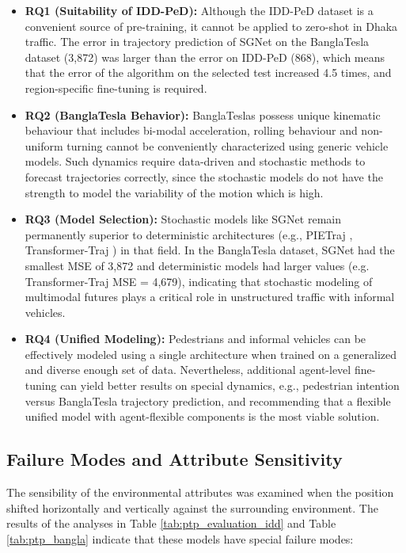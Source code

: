 \documentclass[12pt, a4paper]{article}
\begin{document}
\begin{itemize}
    \item \textbf{RQ1 (Suitability of IDD-PeD):} Although the IDD-PeD dataset \cite{bokkasam2025pedestrian} is a convenient source of pre-training, it cannot be applied to zero-shot in Dhaka traffic. The error in trajectory prediction of SGNet \cite{wang2022stepwise} on the BanglaTesla dataset (3,872) was larger than the error on IDD-PeD (868), which means that the error of the algorithm on the selected test increased 4.5 times, and region-specific fine-tuning is required.
    
    \item \textbf{RQ2 (BanglaTesla Behavior):} BanglaTeslas possess unique kinematic behaviour that includes bi-modal acceleration, rolling behaviour and non-uniform turning cannot be conveniently characterized using generic vehicle models. Such dynamics require data-driven and stochastic methods to forecast trajectories correctly, since the stochastic models do not have the strength to model the variability of the motion which is high.
    
    \item \textbf{RQ3 (Model Selection):} Stochastic models like SGNet \cite{wang2022stepwise} remain permanently superior to deterministic architectures (e.g., PIETraj \cite{rasouli2019pie}, Transformer-Traj \cite{giuliari2021transformer}) in that field. In the BanglaTesla dataset, SGNet had the smallest MSE of 3,872 and deterministic models had larger values (e.g. Transformer-Traj MSE = 4,679), indicating that stochastic modeling of multimodal futures plays a critical role in unstructured traffic with informal vehicles.
    
    \item \textbf{RQ4 (Unified Modeling):} Pedestrians and informal vehicles can be effectively modeled using a single architecture when trained on a generalized and diverse enough set of data. Nevertheless, additional agent-level fine-tuning can yield better results on special dynamics, e.g., pedestrian intention versus BanglaTesla trajectory prediction, and recommending that a flexible unified model with agent-flexible components is the most viable solution.
\end{itemize}


\subsection{Failure Modes and Attribute Sensitivity}
The sensibility of the environmental attributes was examined when the position shifted horizontally and vertically against the surrounding environment. The results of the analyses in Table \ref{tab:ptp_evaluation_idd} and Table \ref{tab:ptp_bangla} indicate that these models have special failure modes:
\end{document}
